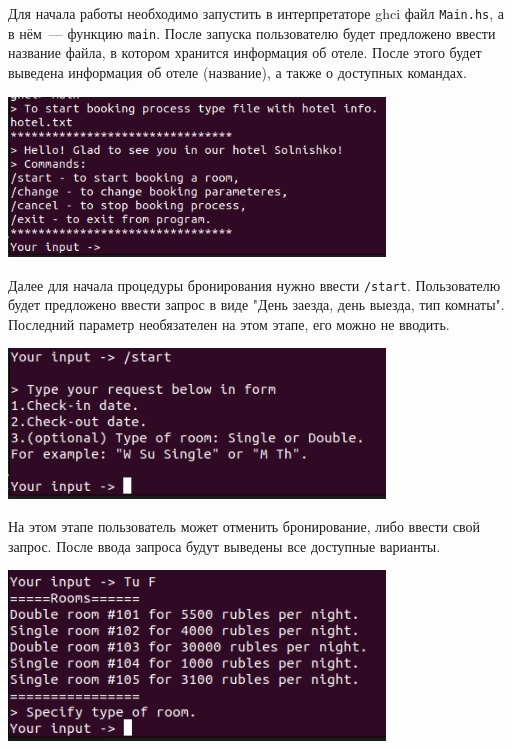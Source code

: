 \documentclass[oneside,final,14pt]{extarticle}
\begin{document}
Для начала работы необходимо запустить в интерпретаторе ghci файл 
\texttt{Main.hs}, а в нём~--- функцию \texttt{main}.
После запуска пользователю будет предложено ввести название файла, в котором 
хранится информация об отеле. После этого будет выведена информация об отеле
(название), а также о доступных командах.
\begin{center}
\includegraphics[width=0.75\textwidth]{picture1.png}
\end{center}
Далее для начала процедуры бронирования нужно ввести \texttt{/start}.
Пользователю будет предложено ввести запрос в виде "День заезда, день выезда, 
тип комнаты". Последний параметр необязателен на этом этапе, его можно не вводить.
\begin{center}
    \includegraphics[width=0.75\textwidth]{picture2.png}
\end{center}
На этом этапе пользователь может отменить бронирование, либо ввести свой запрос.
После ввода запроса будут выведены все доступные варианты.
\begin{center}
    \includegraphics[width=0.75\textwidth]{picture3.png}
\end{center}
\end{document}
